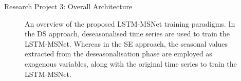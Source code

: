\documentclass{beamer}
\begin{document}
\begin{frame}{Research Project 3: Overall Architecture}
  	\begin{figure}[htp]
\vspace{4mm}
\caption{\tiny An overview of the proposed LSTM-MSNet training paradigms. In the DS approach, deseasonalised time series are used to train the LSTM-MSNet. Whereas in the SE approach, the seasonal values extracted from the deseasonalisation phase are employed as exogenous variables, along with the original time series to train the LSTM-MSNet.}
\label{lstm-schemes}
\end{figure}

\end{frame}
\end{document}
